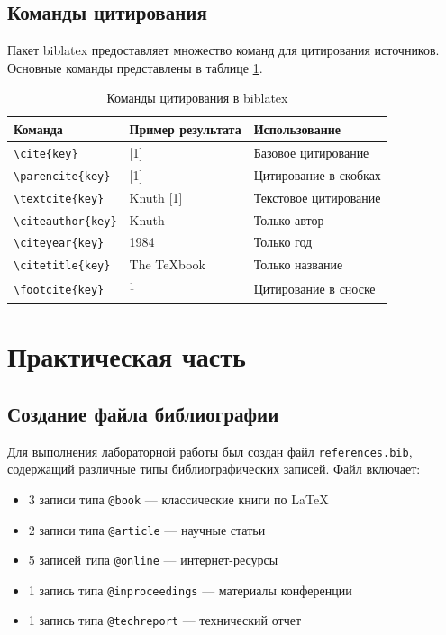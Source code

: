 \documentclass[12pt, a4paper]{article}
\begin{document}
\subsection{Команды цитирования}

Пакет biblatex предоставляет множество команд для цитирования источников. Основные команды представлены в таблице \ref{tab:cite-commands}.

\begin{table}[htbp]
  \centering
  \caption{Команды цитирования в biblatex}
  \label{tab:cite-commands}
  \begin{tabular}{@{}llp{5cm}@{}}
    \toprule
    \textbf{Команда} & \textbf{Пример результата} & \textbf{Использование} \\
    \midrule
    \verb|\cite{key}| & [1] & Базовое цитирование \\
    \verb|\parencite{key}| & [1] & Цитирование в скобках \\
    \verb|\textcite{key}| & Knuth [1] & Текстовое цитирование \\
    \verb|\citeauthor{key}| & Knuth & Только автор \\
    \verb|\citeyear{key}| & 1984 & Только год \\
    \verb|\citetitle{key}| & The TeXbook & Только название \\
    \verb|\footcite{key}| & \textsuperscript{1} & Цитирование в сноске \\
    \bottomrule
  \end{tabular}
\end{table}

\section{Практическая часть}

\subsection{Создание файла библиографии}

Для выполнения лабораторной работы был создан файл \texttt{references.bib}, содержащий различные типы библиографических записей. Файл включает:

\begin{itemize}
  \item 3 записи типа \texttt{@book} — классические книги по LaTeX
  \item 2 записи типа \texttt{@article} — научные статьи
  \item 5 записей типа \texttt{@online} — интернет-ресурсы
  \item 1 запись типа \texttt{@inproceedings} — материалы конференции
  \item 1 запись типа \texttt{@techreport} — технический отчет
\end{itemize}
\end{document}
